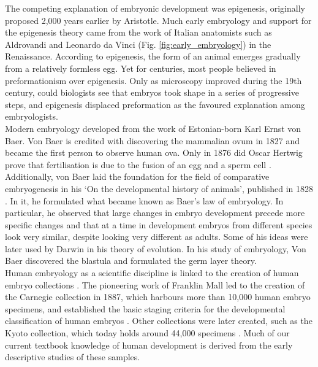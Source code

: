 The competing explanation of embryonic development was epigenesis, originally proposed 2,000 years earlier by Aristotle. 
Much early embryology and support for the epigenesis theory came from the work of Italian anatomists such as Aldrovandi and Leonardo da Vinci (Fig. \ref{fig:early_embryology}) in the Renaissance.
According to epigenesis, the form of an animal emerges gradually from a relatively formless egg. 
Yet for centuries, most people believed in preformationism over epigenesis.
Only as microscopy improved during the 19th century, could biologists see that embryos took shape in a series of progressive steps, and epigenesis displaced preformation as the favoured explanation among embryologists.\\

Modern embryology developed from the work of Estonian-born Karl Ernst von Baer.
Von Baer is credited with discovering the mammalian ovum in 1827 and became the first person to observe human ova.
Only in 1876 did Oscar Hertwig prove that fertilisation is due to the fusion of an egg and a sperm cell \cite{hertwig1875beitraege}.
Additionally, von Baer laid the foundation for the field of comparative embryogenesis in his `On the developmental history of animals', published in 1828 \cite{von1828entwickelungsgeschichte}.
In it, he formulated what became known as Baer's law of embryology.
In particular, he observed that large changes in embryo development precede more specific changes and that at a time in development embryos from different species look very similar, despite looking very different as adults.
Some of his ideas were later used by Darwin in his theory of evolution.
In his study of embryology, Von Baer discovered the blastula and formulated the germ layer theory.\\

Human embryology as a scientific discipline is linked to the creation of human embryo collections \cite{yamada2015human, gasser2014rebirth, shahbazi2020mechanisms}. 
The pioneering work of Franklin Mall led to the creation of the Carnegie collection in 1887, which harbours more than 10,000 human embryo specimens, and established the basic staging criteria for the developmental classification of human embryos \cite{keibel1910manual}. 
Other collections were later created, such as the Kyoto collection, which today holds around 44,000 specimens \cite{nishimura1968normal}. 
Much of our current textbook knowledge of human development is derived from the early descriptive studies of these samples.\\


